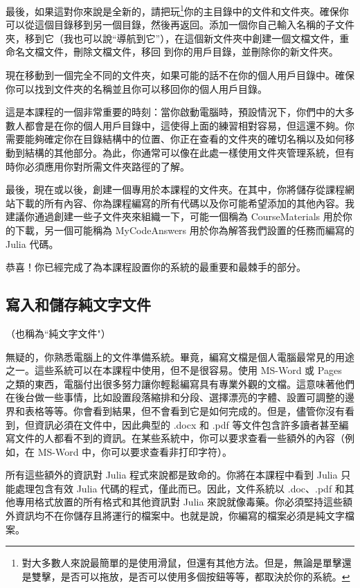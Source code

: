 \documentclass[]{article}
\begin{document}
最後，如果這對你來說是全新的，請把玩\footnote{對大多數人來說最簡單的是使用滑鼠，但還有其他方法。但是，無論是單擊還是雙擊，是否可以拖放，是否可以使用多個按鈕等等，都取決於你的系統。}你的主目錄中的文件和文件夾。確保你可以從這個目錄移到另一個目錄，然後再返回。添加一個你自己輸入名稱的子文件夾，移到它（我也可以說``導航到它''），在這個新文件夾中創建一個文檔文件，重命名文檔文件，刪除文檔文件，移回 到你的用戶目錄，並刪除你的新文件夾。

現在移動到一個完全不同的文件夾，如果可能的話不在你的個人用戶目錄中。確保你可以找到文件夾的名稱並且你可以移回你的個人用戶目錄。

這是本課程的一個非常重要的時刻：當你啟動電腦時，預設情況下，你們中的大多數人都會是在你的個人用戶目錄中，這使得上面的練習相對容易，但這還不夠。你需要能夠確定你在目錄結構中的位置、你正在查看的文件夾的確切名稱以及如何移動到結構的其他部分。為此，你通常可以像在此處一樣使用文件夾管理系統，但有時你必須應用你對所需文件夾路徑的了解。

最後，現在或以後，創建一個專用於本課程的文件夾。在其中，你將儲存從課程網站下載的所有內容、你為課程編寫的所有代碼以及你可能希望添加的其他內容。我建議你通過創建一些子文件夾來組織一下，可能一個稱為 CourseMaterials 用於你的下載，另一個可能稱為 MyCodeAnswers 用於你為解答我們設置的任務而編寫的 Julia 代碼。

恭喜！你已經完成了為本課程設置你的系統的最重要和最棘手的部分。

\subsection*{寫入和儲存純文字文件}

（也稱為``純文字文件"）

無疑的，你熟悉電腦上的文件準備系統。畢竟，編寫文檔是個人電腦最常見的用途之一。這些系統可以在本課程中使用，但不是很容易。使用 MS-Word 或 Pages 之類的東西，電腦付出很多努力讓你輕鬆編寫具有專業外觀的文檔。這意味著他們在後台做一些事情，比如設置段落縮排和分段、選擇漂亮的字體、設置可調整的邊界和表格等等。你會看到結果，但不會看到它是如何完成的。但是，儘管你沒有看到，但資訊必須在文件中，因此典型的 .docx 和 .pdf 等文件包含許多讀者甚至編寫文件的人都看不到的資訊。在某些系統中，你可以要求查看一些額外的內容（例如，在 MS-Word 中，你可以要求查看非打印字符）。

所有這些額外的資訊對 Julia 程式來說都是致命的。你將在本課程中看到 Julia 只能處理包含有效 Julia 代碼的程式，僅此而已。因此，文件系統以 .doc、.pdf 和其他專用格式放置的所有格式和其他資訊對 Julia 來說就像毒藥。你必須堅持這些額外資訊均不在你儲存且將運行的檔案中。也就是說，你編寫的檔案必須是純文字檔案。
\end{document}

